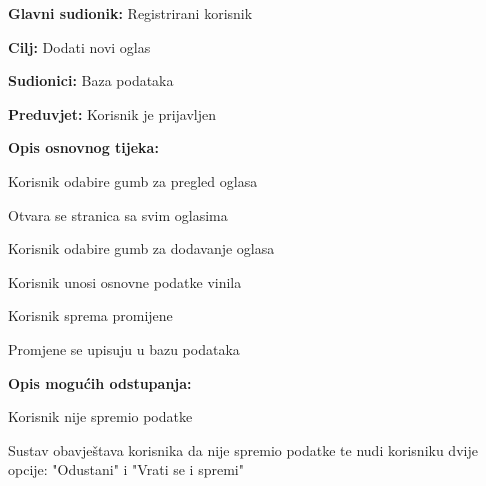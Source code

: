 				\noindent {}
					\begin{packed_item}
	
						\item \textbf{Glavni sudionik: }Registrirani korisnik
						\item  \textbf{Cilj:} Dodati novi oglas
						\item  \textbf{Sudionici:} Baza podataka
						\item  \textbf{Preduvjet:} Korisnik je prijavljen
						\item  \textbf{Opis osnovnog tijeka:}
						
						\item[] \begin{packed_enum}
	
							\item Korisnik odabire gumb za pregled oglasa
							\item Otvara se stranica sa svim oglasima
							\item Korisnik odabire gumb za dodavanje oglasa
							\item Korisnik unosi osnovne podatke vinila
							\item Korisnik sprema promijene
							\item Promjene se upisuju u bazu podataka

						\end{packed_enum}
						
						\item  \textbf{Opis mogućih odstupanja:}
						
						\item[] \begin{packed_item}
								
							\item[5.a] Korisnik nije spremio podatke
								\begin{packed_item}
									\item Sustav obavještava korisnika da nije spremio podatke te nudi korisniku dvije opcije: "Odustani" i "Vrati se i spremi"
								\end{packed_item}
								
								
						\end{packed_item}					
					\end{packed_item}
					
